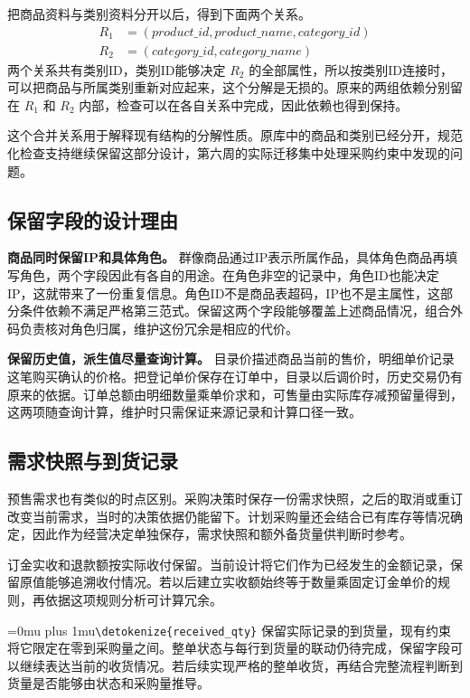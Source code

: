 \documentclass{SYSUReport}
\newcommand{\code}[1]{\begingroup\Urlmuskip=0mu plus 1mu\expandafter\nolinkurl\expandafter{\detokenize{#1}}\endgroup}
\begin{document}
把商品资料与类别资料分开以后，得到下面两个关系。
\begin{align*}
R_1 &= (\mathit{product\_id},\mathit{product\_name},\mathit{category\_id}) \\
R_2 &= (\mathit{category\_id},\mathit{category\_name})
\end{align*}
两个关系共有类别ID，类别ID能够决定 \(R_2\) 的全部属性，所以按类别ID连接时，可以把商品与所属类别重新对应起来，这个分解是无损的。原来的两组依赖分别留在 \(R_1\) 和 \(R_2\) 内部，检查可以在各自关系中完成，因此依赖也得到保持。

这个合并关系用于解释现有结构的分解性质。原库中的商品和类别已经分开，规范化检查支持继续保留这部分设计，第六周的实际迁移集中处理采购约束中发现的问题。

\subsection{保留字段的设计理由}
\textbf{商品同时保留IP和具体角色。} 群像商品通过IP表示所属作品，具体角色商品再填写角色，两个字段因此有各自的用途。在角色非空的记录中，角色ID也能决定IP，这就带来了一份重复信息。角色ID不是商品表超码，IP也不是主属性，这部分条件依赖不满足严格第三范式。保留这两个字段能够覆盖上述商品情况，组合外码负责核对角色归属，维护这份冗余是相应的代价。

\textbf{保留历史值，派生值尽量查询计算。} 目录价描述商品当前的售价，明细单价记录这笔购买确认的价格。把登记单价保存在订单中，目录以后调价时，历史交易仍有原来的依据。订单总额由明细数量乘单价求和，可售量由实际库存减预留量得到，这两项随查询计算，维护时只需保证来源记录和计算口径一致。

\medskip
\Needspace{0.74\textheight}
\subsection{需求快照与到货记录}
预售需求也有类似的时点区别。采购决策时保存一份需求快照，之后的取消或重订改变当前需求，当时的决策依据仍能留下。计划采购量还会结合已有库存等情况确定，因此作为经营决定单独保存，需求快照和额外备货量供判断时参考。

订金实收和退款额按实际收付保留。当前设计将它们作为已经发生的金额记录，保留原值能够追溯收付情况。若以后建立实收额始终等于数量乘固定订金单价的规则，再依据这项规则分析可计算冗余。

\code{received_qty} 保留实际记录的到货量，现有约束将它限定在零到采购量之间。整单状态与每行到货量的联动仍待完成，保留字段可以继续表达当前的收货情况。若后续实现严格的整单收货，再结合完整流程判断到货量是否能够由状态和采购量推导。
\end{document}
